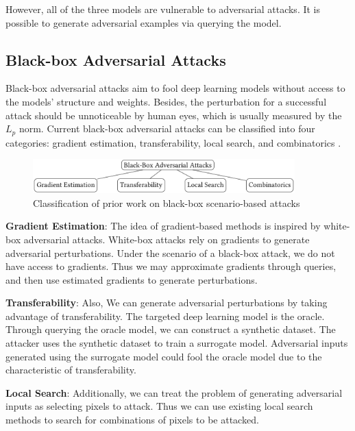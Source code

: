 However, all of the three models are vulnerable to adversarial attacks. It is possible to generate adversarial examples via querying the model.

\subsection{Black-box Adversarial Attacks}
\label{black_box}

Black-box adversarial attacks aim to fool deep learning models without access to the models' structure and weights. Besides, the perturbation for a successful attack should be unnoticeable by human eyes, which is usually measured by the $L_p$ norm. Current black-box adversarial attacks can be classified into four categories: gradient estimation, transferability, local search, and combinatorics \citep{bhambri2019survey}.

\begin{figure}[H]
\centering
\includegraphics[width=0.9\textwidth]{figures/chapter_classification/review.png}
\caption{Classification of prior work on black-box scenario-based attacks \citep{bhambri2019survey}}
\label{fig.bb_review}
\end{figure}

\textbf{Gradient Estimation}: The idea of gradient-based methods is inspired by white-box adversarial attacks. White-box attacks rely on gradients to generate adversarial perturbations. Under the scenario of a black-box attack, we do not have access to gradients. Thus we may approximate gradients through queries, and then use estimated gradients to generate perturbations. 

\textbf{Transferability}: Also, We can generate adversarial perturbations by taking advantage of transferability. The targeted deep learning model is the oracle. Through querying the oracle model, we can construct a synthetic dataset. The attacker uses the synthetic dataset to train a surrogate model. Adversarial inputs generated using the surrogate model could fool the oracle model due to the characteristic of transferability.

\textbf{Local Search}: Additionally, we can treat the problem of generating adversarial inputs as selecting pixels to attack. Thus we can use existing local search methods to search for combinations of pixels to be attacked.  

